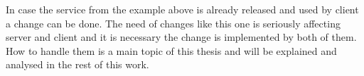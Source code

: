 In case the service from the example above is already released and used by client a change can be done. The need of changes like this one is seriously affecting server and client and it is necessary the change is implemented by both of them. How to handle them is a main topic of this thesis and will be explained and analysed in the rest of this work.




